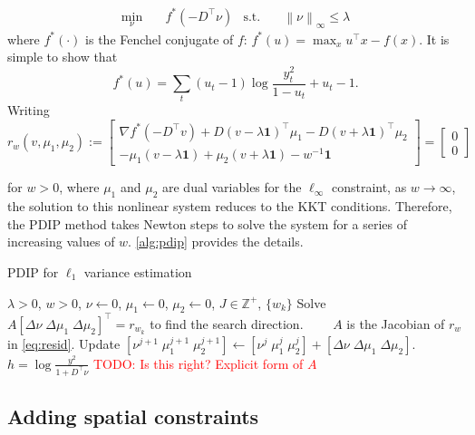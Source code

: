 \documentclass{article}
\newcommand{\attn}[1]{\textcolor{red}{TODO: #1}}
\newcommand{\one}{\mathbf{1}}
\newcommand{\norm}[1]{\left\lVert #1 \right\rVert}
\begin{document}
\begin{align}
\min_\nu&\quad f^*(-D^\top\nu) & \mbox{s.t.}&\quad \norm{ \nu }_\infty \le \lambda
\end{align}
 where $f^*(\cdot)$ is the Fenchel conjugate of $f$: $f^*(u)=\max_x
 u^\top x-f(x)$. It is simple to show that 
\begin{equation}
f^*(u)=\sum_t (u_t-1)\log\frac{y_t^2}{1-u_t} + u_t-1.
\label{eq:conj}
\end{equation}
Writing
\begin{equation}
  r_w(v,\mu_1,\mu_2):=
  \begin{bmatrix}
    \nabla f^*(-D^\top v) + D(v-\lambda \one)^\top \mu_1 -
    D(v+\lambda \one)^\top \mu_2\\
    -\mu_1(v-\lambda\one)+\mu_2(v + \lambda\one) -w^{-1}\one
  \end{bmatrix}
  =
  \begin{bmatrix}
  0\\0\end{bmatrix}
\label{eq:resid}
\end{equation}

for $w>0$, where $\mu_1$ and $\mu_2$ are dual variables for the
$\ell_\infty$ constraint, as $w\rightarrow\infty$,
the solution to this nonlinear system reduces to the KKT
conditions. Therefore, the PDIP method takes Newton steps to solve the
system for a series of increasing values of $w$. \autoref{alg:pdip}
provides the details. 
\begin{algorithm}[tb]
  \caption{PDIP for $\ell_1$ variance estimation}
  \label{alg:pdip}
  \begin{algorithmic}
    \REQUIRE $\lambda>0$, $w>0$, $\nu\leftarrow 0$, $\mu_1\leftarrow
    0$, $\mu_2\leftarrow 0$, $J\in\mathbb{Z}^+$, $\{w_k\}$
    \STATE Solve $A [\Delta\nu\; \Delta\mu_1\; \Delta\mu_2]^\top=r_{w_k}$ to find the search direction.
    \STATE $\quad\quad A$ is the Jacobian of $r_w$ in \eqref{eq:resid}.
    \STATE Update $[\nu^{j+1}\; \mu^{j+1}_1\; \mu^{j+1}_2] \leftarrow
    [\nu^{j}\; \mu^{j}_1\; \mu^{j}_2] + [\Delta\nu\; \Delta\mu_1\;
    \Delta\mu_2]$. 
    \ENDFOR
   \ENDFOR
   \RETURN $h=\log\frac{y^2}{1+D^\top\nu}$ \attn{Is this right?
     Explicit form of $A$}
  \end{algorithmic}
\end{algorithm}


\subsection{Adding spatial constraints}
\label{sec:exten}
\end{document}
